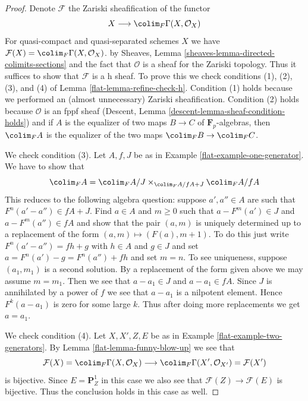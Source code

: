 \begin{proof}

Denote $\mathcal{F}$ the Zariski sheafification
of the functor
$$
X \longrightarrow \colim_F \Gamma(X, \mathcal{O}_X)
$$
For quasi-compact and quasi-separated schemes $X$
we have $\mathcal{F}(X) = \colim_F \Gamma(X, \mathcal{O}_X)$.
by Sheaves, Lemma \ref{sheaves-lemma-directed-colimits-sections}
and the fact that $\mathcal{O}$ is a sheaf for the Zariski topology.
Thus it suffices to show that $\mathcal{F}$ is a h sheaf.
To prove this we check conditions (1), (2), (3), and (4) of
Lemma \ref{flat-lemma-refine-check-h}.
Condition (1) holds because we performed an (almost unnecessary)
Zariski sheafification. Condition (2) holds because
$\mathcal{O}$ is an fppf sheaf (Descent, Lemma
\ref{descent-lemma-sheaf-condition-holds}) and if
$A$ is the equalizer of two maps $B \to C$ of $\mathbf{F}_p$-algebras,
then $\colim_F A$ is the equalizer of the two maps
$\colim_F B \to \colim_F C$.

\medskip\noindent
We check condition (3). Let $A, f, J$ be as in
Example \ref{flat-example-one-generator}.
We have to show that
$$
\colim_F A = \colim_F A/J \times_{\colim_F A/fA + J} \colim_F A/fA
$$
This reduces to the following algebra question: suppose $a', a'' \in A$
are such that $F^n(a' - a'') \in fA + J$. Find $a \in A$ and $m \geq 0$
such that $a - F^m(a') \in J$ and $a - F^m(a'') \in fA$ and show that
the pair $(a, m)$ is uniquely determined up to a replacement of the
form $(a, m) \mapsto (F(a), m + 1)$.
To do this just write $F^n(a' - a'') = f h + g$ with $h \in A$ and $g \in J$
and set $a = F^n(a') - g = F^n(a'') + fh$ and set $m = n$.
To see uniqueness, suppose $(a_1, m_1)$ is a second solution.
By a replacement of the form given above we may assume $m = m_1$.
Then we see that $a - a_1 \in J$ and $a - a_1 \in fA$.
Since $J$ is annihilated by a power of $f$ we see that
$a - a_1$ is a nilpotent element. Hence $F^k(a - a_1)$ is zero
for some large $k$. Thus after doing more replacements we get
$a = a_1$.

\medskip\noindent
We check condition (4). Let $X, X', Z, E$ be as in
Example \ref{flat-example-two-generators}. By
Lemma \ref{flat-lemma-funny-blow-up} we see that
$$
\mathcal{F}(X) = \colim_F \Gamma(X, \mathcal{O}_X)
\longrightarrow
\colim_F \Gamma(X', \mathcal{O}_{X'}) = \mathcal{F}(X')
$$
is bijective. Since $E = \mathbf{P}^1_Z$ in this case we also
see that $\mathcal{F}(Z) \to \mathcal{F}(E)$ is bijective.
Thus the conclusion holds in this case as well.
\end{proof}

